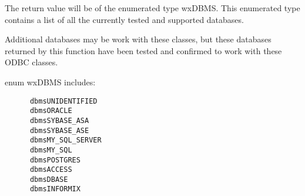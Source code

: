 \begin{comment} %
\membersection{wxDb::IsFwdOnlyCursors}\label{wxdbisfwdonlycursors}

\func{bool}{IsFwdOnlyCursors}{\void}

\wxheading{Remarks}

This setting indicates whether this database connection was created
as being capable of using only forward scrolling cursors.  This function
does NOT indicate if the ODBC driver or datasource supports backward
scrolling cursors.  There is no standard way of detecting if the driver
or datasource can support backward scrolling cursors.

If a wxDb instance was created as being forward only cursors, then even if
the datasource and ODBC driver support backward scrolling cursors, then
tables using this database connection can only use forward scrolling
cursors.

The default setting of whether a wxDb connection to a database allows
forward-only or also backward scrolling cursors is defined in setup.h by 
the wxODBC_FWD_ONLY_CURSORS value.  This default setting can be overridden
when the wxDb connection is initially created (see \helpref{wxDb constructor}{wxdbconstr}).

\wxheading{Return value}

Returns TRUE if this datasource connection is defined as using only forward
scrolling cursors, or FALSE if the connection is defined as being capable
of supporting backward scrolling cursors (see note above).

\wxheading{See also}

\helpref{wxDb constructor}{wxdbconstr}
\end{comment}

\label{wxdbdbms}



The return value will be of the enumerated type wxDBMS.  This enumerated
type contains a list of all the currently tested and supported databases.

Additional databases may be work with these classes, but these databases
returned by this function have been tested and confirmed to work with 
these ODBC classes.

enum wxDBMS includes:
\begin{verbatim}
      dbmsUNIDENTIFIED
      dbmsORACLE
      dbmsSYBASE_ASA
      dbmsSYBASE_ASE
      dbmsMY_SQL_SERVER
      dbmsMY_SQL
      dbmsPOSTGRES
      dbmsACCESS
      dbmsDBASE
      dbmsINFORMIX	
\end{verbatim}

